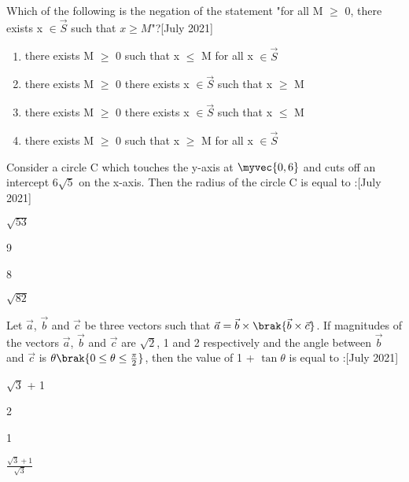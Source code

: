 \iffalse
\title{2021}
\author{EE24BTECH11012}
\section{mcq-single}
\fi
	\item Which of the following is the negation of the statement "for all M $\geq$ 0, there exists x $\in \vec{S}$ such that $x\geq M$"?\hfill{[July 2021]}
		\begin{enumerate}
			\item there exists M $\geq$ 0 such that x $\leq$ M for all x $\in \vec{S}$
			\item there exists M $\geq$ 0 there exists x $\in \vec{S}$ such that x $\geq$ M
			\item there exists M $\geq$ 0 there exists x $\in \vec{S}$ such that x $\leq$ M
			\item there exists M $\geq$ 0 such that x $\geq$ M for all x $\in \vec{S}$
		\end{enumerate}
	\item Consider a circle C which touches the y-axis at $\myvec{0,6}$ and cuts off an intercept $6\sqrt{5}$ on the x-axis. Then the radius of the circle C is equal to :\hfill{[July 2021]}
		\begin{enumerate}
		\end{enumerate}
	\item Let $\vec{a}$, $\vec{b}$ and $\vec{c}$ be three vectors such that $\vec{a} = \vec{b} \times \brak{\vec{b} \times \vec{c}}$. If magnitudes of the vectors $\vec{a}$, $\vec{b}$ and $\vec{c}$ are $\sqrt{2}$, 1 and 2 respectively and the angle between $\vec{b}$ and $\vec{c}$ is $\theta \brak{0 \leq \theta \leq \frac{\pi}{2}}$, then the value of 1 + $\tan{\theta}$ is equal to :\hfill{[July 2021]}
		\begin{enumerate}
				\begin{multicols}{4}
				\item $\sqrt{3}$ + 1
				\item 2
				\item 1
				\item $ \frac{\sqrt{3} + 1}{\sqrt{3}}$
				\end{multicols}
		\end{enumerate}
